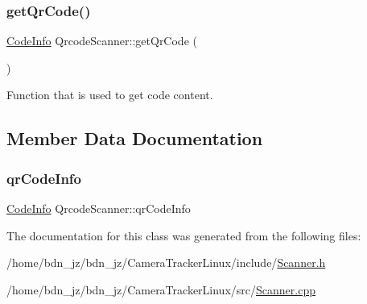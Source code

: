 \subsubsection{\texorpdfstring{get\+Qr\+Code()}{getQrCode()}}
{\footnotesize\ttfamily \hyperlink{struct_code_info}{Code\+Info} Qrcode\+Scanner\+::get\+Qr\+Code (\begin{DoxyParamCaption}{ }\end{DoxyParamCaption})}



Function that is used to get code content. 



\subsection{Member Data Documentation}
\mbox{\label{class_qrcode_scanner_af93303c867d09d136c94015610071c91}} 
\subsubsection{\texorpdfstring{qr\+Code\+Info}{qrCodeInfo}}
{\footnotesize\ttfamily \hyperlink{struct_code_info}{Code\+Info} Qrcode\+Scanner\+::qr\+Code\+Info\hspace{0.3cm}{\ttfamily [private]}}



The documentation for this class was generated from the following files\+:\begin{DoxyCompactItemize}
\item 
/home/bdn\+\_\+jz/bdn\+\_\+jz/\+Camera\+Tracker\+Linux/include/\hyperlink{_scanner_8h}{Scanner.\+h}\item 
/home/bdn\+\_\+jz/bdn\+\_\+jz/\+Camera\+Tracker\+Linux/src/\hyperlink{_scanner_8cpp}{Scanner.\+cpp}\end{DoxyCompactItemize}
